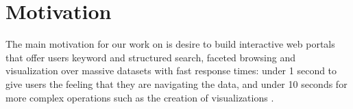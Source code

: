 \section{Motivation}
\label{sec:motivation}
The main motivation for our work on \ldviews is desire to build interactive web portals that offer users keyword and structured search, faceted browsing and visualization over massive datasets with fast response times:  under 1 second to give users the feeling that they are navigating the data, and under 10 seconds for more complex operations such as the creation of visualizations \cite{nielsen1994usability}.